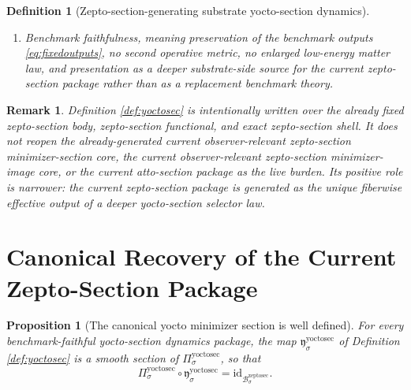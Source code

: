 \documentclass[11pt]{article}
\newcommand{\ZeptoSectionBody}[1]{\mathcal B_{#1}^{\mathrm{zeptosec}}}
\newcommand{\ZeptoSectionShell}[1]{\mathcal Z_{#1}^{\mathrm{zeptosec}}}
\newcommand{\YoctoSectionProj}[1]{\Pi_{#1}^{\mathrm{yoctosec}}}
\newcommand{\YoctoSectionFiber}[2]{\mathcal F_{#1}^{\mathrm{yoctosec}}(#2)}
\newcommand{\YoctoSectionZeptoMin}[1]{\mathfrak y_{#1}^{\mathrm{yoctosec}}}
\newcommand{\YoctoSectionFunctional}[1]{\mathscr C_{#1}^{\mathrm{yoctosec}}}
\newcommand{\YoctoSectionShell}[1]{\mathcal Z_{#1}^{\mathrm{yoctosec}}}
\newtheorem{definition}{Definition}
\newtheorem{proposition}{Proposition}
\newtheorem{remark}{Remark}
\begin{document}
\begin{definition}[Zepto-section-generating substrate yocto-section dynamics]
\begin{enumerate}
\[\begin{array}{l}
    \YoctoSectionProj{\sigma}(y)\in\ZeptoSectionShell{\sigma},\\[0.2em]
    \YoctoSectionFunctional{\sigma}(y)
    =
    \displaystyle\min_{x\in\YoctoSectionFiber{\sigma}{\YoctoSectionProj{\sigma}(y)}}
    \YoctoSectionFunctional{\sigma}(x)
    \end{array}
    \right\},
    \]
    and
    \[
    \YoctoSectionProj{\sigma}\big|_{\YoctoSectionShell{\sigma}}
    :
    \YoctoSectionShell{\sigma}
    \xrightarrow{\cong}
    \ZeptoSectionShell{\sigma}
    \]
    is a diffeomorphism.
    \item Benchmark faithfulness, meaning preservation of the benchmark outputs \eqref{eq:fixedoutputs}, no second operative metric, no enlarged low-energy matter law, and presentation as a deeper substrate-side source for the current zepto-section package rather than as a replacement benchmark theory.
\end{enumerate}
\end{definition}

\begin{remark}
Definition \ref{def:yoctosec} is intentionally written over the already fixed zepto-section body, zepto-section functional, and exact zepto-section shell. It does not reopen the already-generated current observer-relevant zepto-section minimizer-section core, the current observer-relevant zepto-section minimizer-image core, or the current atto-section package as the live burden. Its positive role is narrower: the current zepto-section package is generated as the unique fiberwise effective output of a deeper yocto-section selector law.
\end{remark}

\section{Canonical Recovery of the Current Zepto-Section Package}

\begin{proposition}[The canonical yocto minimizer section is well defined]
\label{prop:section}
For every benchmark-faithful yocto-section dynamics package, the map \(\YoctoSectionZeptoMin{\sigma}\) of Definition \ref{def:yoctosec} is a smooth section of \(\YoctoSectionProj{\sigma}\), so that
\[
\YoctoSectionProj{\sigma}\circ\YoctoSectionZeptoMin{\sigma}
=
\mathrm{id}_{\ZeptoSectionBody{\sigma}}.
\]
\end{proposition}
\end{document}
